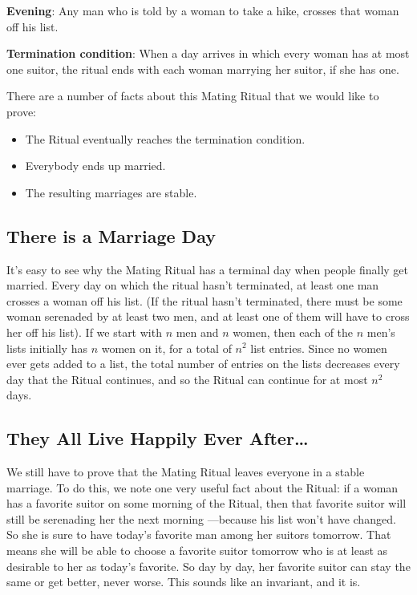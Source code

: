 \textbf{Evening}: Any man who is told by a woman to take a hike,
crosses that woman off his list.

\textbf{Termination condition}: When a day arrives in which every
woman has at most one suitor, the ritual ends with each woman marrying
her suitor, if she has one.


There are a number of facts about this Mating Ritual that we would like to
prove:

\begin{itemize}
\item The Ritual eventually reaches the termination condition.
\item Everybody ends up married.
\item The resulting marriages are stable.
\end{itemize}


\subsection{There is a Marriage Day}

It's easy to see why the Mating Ritual has a terminal day when people
finally get married.  Every day on which the ritual hasn't terminated, at
least one man crosses a woman off his list.  (If the ritual hasn't
terminated, there must be some woman serenaded by at least two men, and at
least one of them will have to cross her off his list).  If we start with
$n$ men and $n$ women, then each of the $n$ men's lists initially has $n$
women on it, for a total of $n^2$ list entries.  Since no women ever gets
added to a list, the total number of entries on the lists decreases every
day that the Ritual continues, and so the Ritual can continue for at most
$n^2$ days.

\subsection{They All Live Happily Ever After\dots}

We still have to prove that the Mating Ritual leaves everyone in a
stable marriage.  To do this, we note one very useful fact about the
Ritual: if a woman has a favorite suitor on some morning of the
Ritual, then that favorite suitor will still be serenading her the
next morning ---because his list won't have changed.  So she is sure to
have today's favorite man among her suitors tomorrow.  That means she
will be able to choose a favorite suitor tomorrow who is at least as
desirable to her as today's favorite.  So day by day, her favorite
suitor can stay the same or get better, never worse.  This sounds like
an invariant, and it is.

